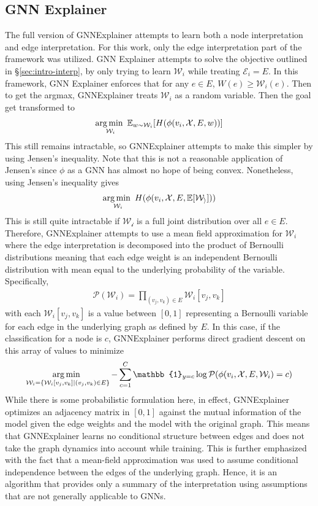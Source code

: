 \subsection{GNN Explainer}
The full version of GNNExplainer attempts to learn both a node interpretation and edge interpretation. For this work, only the edge interpretation part of the framework was utilized. GNN Explainer attempts to solve the objective outlined in \S\ref{sec:intro-interp}, by only trying to learn $\mathcal{W}_i$ while treating $\mathcal{E}_i = E$. In this framework, GNN Explainer enforces that for any $e \in E$, $W(e) \geq \mathcal{W}_i(e)$. Then to get the argmax, GNNExplainer treats $\mathcal{W}_i$ as a random variable. Then the goal get transformed to 
\begin{align*}
	\operatorname*{arg\,min\,\,}_{\mathcal{W}_i} \mathbb{E}_{w \sim \mathcal{W}_i} [H(\phi(v_i, \mathcal{X}, E, w))]
\end{align*}
This still remains intractable, so GNNExplainer attempts to make this simpler by using Jensen's inequality. Note that this is not a reasonable application of Jensen's since $\phi$ as a GNN has almost no hope of being convex. Nonetheless, using Jensen's inequality gives
\begin{align*}
	\operatorname*{arg\,min\,\,}_{\mathcal{W}_i} H(\phi(v_i, \mathcal{X}, E, \mathbb{E}[\mathcal{W_i}]))
\end{align*}
This is still quite intractable if $\mathcal{W_i}$ is a full joint distribution over all $e \in E$. Therefore, GNNExplainer attempts to use a mean field approximation for $\mathcal{W}_i$ where the edge interpretation is decomposed into the product of Bernoulli distributions meaning that each edge weight is an independent Bernoulli distribution with mean equal to the underlying probability of the variable. Specifically,
\begin{align*}
	\mathcal{P}(\mathcal{W}_i) = \prod_{(v_j, v_k) \in E} \mathcal{W}_i[v_j, v_k]
\end{align*}
with each $\mathcal{W}_i[v_j, v_k]$ is a value between $[0, 1]$ representing a Bernoulli variable for each edge in the underlying graph as defined by $E$. In this case, if the classification for a node is $c$, GNNExplainer performs direct gradient descent on this array of values to minimize
\begin{align*}
	\argmin_{\mathcal{W}_i = \{\mathcal{W}_i[v_j, v_k] \mid (v_j, v_k) \in E\}} -\sum_{c=1}^C \mathbb{1}_{y = c} \log \mathcal{P}(\phi(v_i, \mathcal{X}, E, \mathcal{W}_i) = c)
\end{align*}
While there is some probabilistic formulation here, in effect, GNNExplainer optimizes an adjacency matrix in $[0, 1]$ against the mutual information of the model given the edge weights and the model with the original graph. This means that GNNExplainer learns no conditional structure between edges and does not take the graph dynamics into account while training. This is further emphasized with the fact that a mean-field approximation was used to assume conditional independence between the edges of the underlying graph. Hence, it is an algorithm that provides only a summary of the interpretation using assumptions that are not generally applicable to GNNs.
